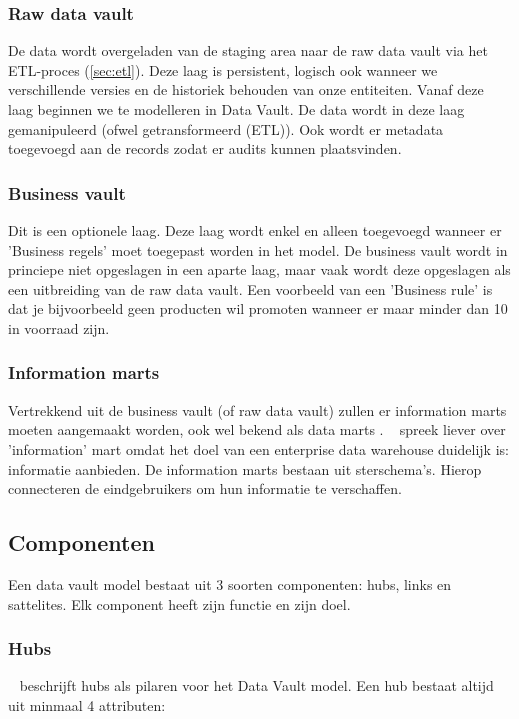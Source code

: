 \subsubsection{Raw data vault}
De data wordt overgeladen van de staging area naar de raw data vault via het ETL-proces (\ref{sec:etl}). Deze laag is persistent, logisch ook wanneer we verschillende versies en de historiek behouden van onze entiteiten. Vanaf deze laag beginnen we te modelleren in Data Vault. De data wordt in deze laag gemanipuleerd (ofwel getransformeerd (ETL)). Ook wordt er metadata toegevoegd aan de records zodat er audits kunnen plaatsvinden. 

\subsubsection{Business vault}
Dit is een optionele laag. Deze laag wordt enkel en alleen toegevoegd wanneer er 'Business regels' moet toegepast worden in het model. De business vault wordt in princiepe niet opgeslagen in een aparte laag, maar vaak wordt deze opgeslagen als een uitbreiding van de raw data vault. Een voorbeeld van een 'Business rule' is dat je bijvoorbeeld geen producten wil promoten wanneer er maar minder dan 10 in voorraad zijn.

\subsubsection{Information marts}
Vertrekkend uit de business vault (of raw data vault) zullen er information marts moeten aangemaakt worden, ook wel bekend als data marts . ~\textcite{Linstedt2016} spreek liever over 'information' mart omdat het doel van een enterprise data warehouse duidelijk is: informatie aanbieden. 
De information marts bestaan uit sterschema's. Hierop connecteren de eindgebruikers om hun informatie te verschaffen. 

\subsection{Componenten}
Een data vault model bestaat uit 3 soorten componenten: hubs, links en sattelites. Elk component heeft zijn functie en zijn doel.

\subsubsection{Hubs}
~\textcite{Linstedt2016} beschrijft hubs als pilaren voor het Data Vault model. Een hub bestaat altijd uit minmaal 4 attributen:

